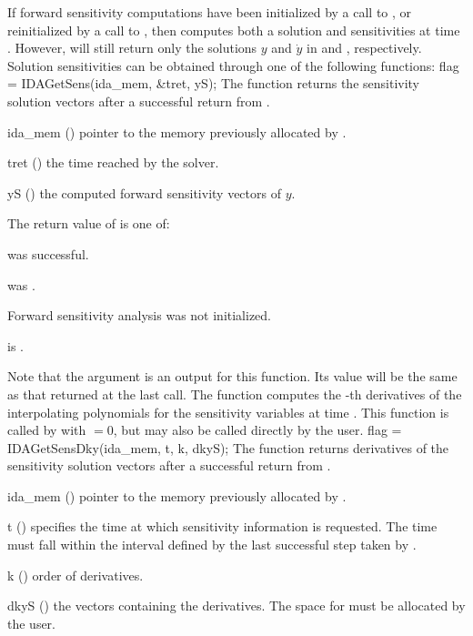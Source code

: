 If forward sensitivity computations have been initialized by a call to
, or reinitialized by a call to ,
then {\idas} computes both a solution and sensitivities at time
. However,  will still return only the solutions
$y$ and $\dot{y}$ in  and , respectively.  Solution
sensitivities can be obtained through one of the following functions:
{
  flag = IDAGetSens(ida\_mem, \&tret, yS);
}
{
  The function  returns the sensitivity solution vectors after a
  successful return from .
}
{
  \begin{args}
  \item[ida\_mem] ()
    pointer to the memory previously allocated by .
  \item[tret] ()
    the time reached by the solver.
  \item[yS] ()
    the computed forward sensitivity vectors of $y$.
  \end{args}
}
{
  The return value  of  is one of:
  \begin{args}
  \item[\Id{IDA\_SUCCESS}] 
     was successful.
  \item[\Id{IDA\_MEM\_NULL}] 
     was .
  \item[\Id{IDA\_NO\_SENS}] 
    Forward sensitivity analysis was not initialized.
  \item[\Id{IDA\_BAD\_DKY}] 
     is .
  \end{args}
}
{
  Note that the argument  is an output for this function. Its value will be
  the same as that returned at the last  call.
}
The function  computes the -th derivatives of the interpolating 
polynomials for the sensitivity variables at time .
This function is called by  with  $= 0$, but may also be called 
directly by the user.
{
  flag = IDAGetSensDky(ida\_mem, t, k, dkyS);
}
{
  The function  returns derivatives of the sensitivity solution 
  vectors after a successful return from .
}
{
  \begin{args}
  \item[ida\_mem] ()
    pointer to the memory previously allocated by .
  \item[t] ()
    specifies the time at which sensitivity information is 
    requested. The time  must fall within the interval defined by the last 
    successful step taken by {\idas}.
  \item[k] () order of derivatives.
  \item[dkyS] ()
    the vectors containing the derivatives. The space for  must be allocated by 
    the user. 
  \end{args}
}
